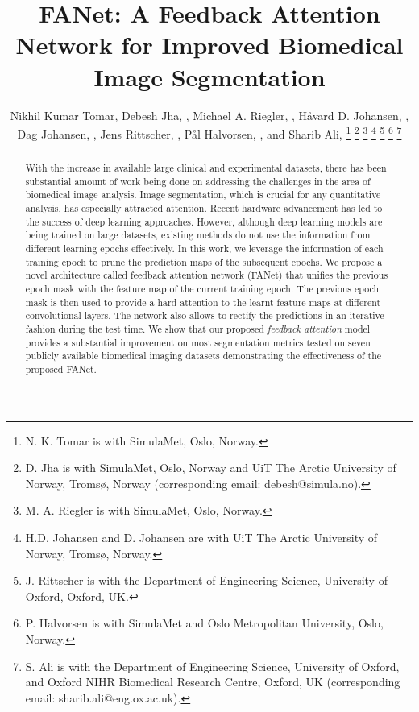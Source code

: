 \documentclass[journal]{IEEEtran}
\begin{document}
\title{{FANet:} A Feedback Attention Network for Improved Biomedical Image Segmentation}
\author{Nikhil Kumar Tomar, 
Debesh Jha, , 
Michael A. Riegler, , 
H{\aa}vard D. Johansen, ,
Dag Johansen, , 
Jens Rittscher, ,
P{\aa}l Halvorsen, , and 
Sharib Ali, 
\thanks{N. K. Tomar is with SimulaMet, Oslo, Norway.}
\thanks{D. Jha is with SimulaMet, Oslo, Norway and UiT The Arctic University of Norway, Troms{\o}, Norway (corresponding email: debesh@simula.no).}
\thanks{M. A. Riegler is with SimulaMet, Oslo, Norway.}
\thanks{H.D. Johansen and D. Johansen are with UiT The Arctic University of Norway, Troms{\o}, Norway.}
\thanks{J. Rittscher is with the Department of Engineering Science, University of Oxford, Oxford, UK.}
\thanks{P. Halvorsen is with SimulaMet and Oslo Metropolitan University, Oslo, Norway.}
\thanks{S. Ali is with the Department of Engineering Science, University of Oxford, and Oxford NIHR Biomedical Research Centre, Oxford, UK (corresponding email: sharib.ali@eng.ox.ac.uk).}
}
\maketitle

\begin{abstract}
With the increase in available large clinical and experimental datasets, there has been substantial amount of work being done on addressing the challenges in the area of biomedical image analysis. Image segmentation, which is crucial for any quantitative analysis, has especially attracted attention. Recent hardware advancement has led to the success of deep learning approaches. However, although deep learning models are being trained on large datasets, existing methods do not use the information from different learning epochs effectively. In this work, we leverage the information of each training epoch to prune the prediction maps of the subsequent epochs. We propose a novel architecture called feedback attention network (FANet) that unifies the previous epoch mask with the feature map of the current training epoch. The previous epoch mask is then used to provide a hard attention to the learnt feature maps at different convolutional layers. The network also allows to rectify the predictions in an iterative fashion during the test time. We show that our proposed \textit{feedback attention} model provides a substantial improvement on most segmentation metrics tested on seven publicly available biomedical imaging datasets demonstrating the effectiveness of the proposed FANet. 
\end{abstract}
\end{document}

